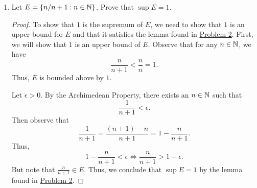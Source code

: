\documentclass[11pt,a4paper]{article}
\begin{document}
\begin{enumerate}
\begin{proof}
    Suppose \( \gamma < \alpha  \). Then \( \alpha - \gamma > 0  \). Choose  \( \epsilon = \alpha - \gamma  \).  Our goal is to find some element \( x \in E  \) such that \( x > \gamma \). By assumption, there exists an element \( {x}_{0} \in E  \) such that     
    \[  {x}_{0} > \alpha - \epsilon = \alpha - (\alpha - \gamma) = \gamma. \]
    Thus, \( {x}_{0} > \gamma  \) for some \( {x}_{0} \in E  \). Therefore, \( \gamma  \) is NOT an upper bound of \( E  \) and so we conclude that 
    \[  \alpha = \sup E. \]
    \end{proof}

\item Let \( E  = \{ n / n + 1 : n \in \mathbb{N}  \}  \). Prove that \( \sup E  = 1  \). 
    \begin{proof}
    To show that \( 1  \) is the supremum of \( E  \), we need to show that \( 1  \) is an upper bound for \( E  \) and that it satisfies the lemma found in {\hyperref[Problem 2]{Problem 2}}. First, we will show that \( 1  \) is an upper bound of \( E  \). Observe that for any \( n \in \mathbb{N}  \), we have  
    \[  \frac{ n  }{  n + 1  }  < \frac{  n }{ n }  = 1.  \]
    Thus, \( E  \) is bounded above by \( 1 \). 

    Let \( \epsilon > 0  \). By the Archimedean Property, there exists an \( n \in \mathbb{N}  \) such that   
    \[ \frac{ 1 }{ n + 1  } < \epsilon.  \]
    Then observe that 
    \[  \frac{ 1 }{ n + 1  }  = \frac{ (n+1) - n  }{ n + 1  } = 1 - \frac{ n  }{ n + 1  }.   \]
    Thus, 
    \[  1 - \frac{ n }{ n + 1  } < \epsilon \Longleftrightarrow \frac{ n }{ n + 1 }  > 1 - \epsilon. \]
    But note that \( \frac{  n  }{  n+ 1 } \in E   \). Thus, we conclude that \( \sup E = 1    \) by the lemma found in {\hyperref[Problem 2]{Problem 2}}. 
    
    

     \end{proof}


\end{enumerate}
\end{document}
